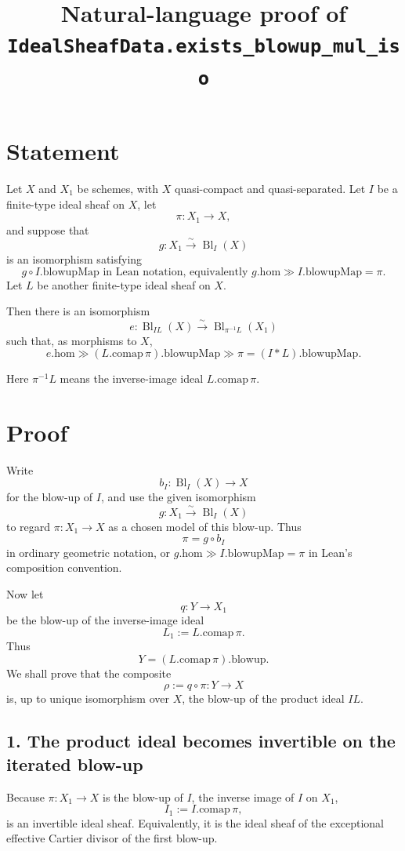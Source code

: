 \documentclass[11pt]{article}
\title{Natural-language proof of \texttt{IdealSheafData.exists\_blowup\_mul\_iso}}
\author{}
\date{}
\newcommand{\Bl}{\operatorname{Bl}}
\begin{document}
\maketitle

\section*{Statement}

Let \(X\) and \(X_1\) be schemes, with \(X\) quasi-compact and quasi-separated.
Let \(I\) be a finite-type ideal sheaf on \(X\), let
\[
  \pi : X_1 \longrightarrow X,
\]
and suppose that
\[
  g : X_1 \xrightarrow{\sim} \Bl_I(X)
\]
is an isomorphism satisfying
\[
  g \circ I.\mathrm{blowupMap} \text{ in Lean notation, equivalently }
  g.\mathrm{hom} \gg I.\mathrm{blowupMap}=\pi.
\]
Let \(L\) be another finite-type ideal sheaf on \(X\).

Then there is an isomorphism
\[
  e :
  \Bl_{I L}(X)
  \xrightarrow{\sim}
  \Bl_{\pi^{-1}L}(X_1)
\]
such that, as morphisms to \(X\),
\[
  e.\mathrm{hom}
  \gg
  (L.\mathrm{comap}\,\pi).\mathrm{blowupMap}
  \gg
  \pi
  =
  (I*L).\mathrm{blowupMap}.
\]

Here \(\pi^{-1}L\) means the inverse-image ideal
\(L.\mathrm{comap}\,\pi\).

\section*{Proof}

Write
\[
  b_I : \Bl_I(X)\longrightarrow X
\]
for the blow-up of \(I\), and use the given isomorphism
\[
  g:X_1\xrightarrow{\sim}\Bl_I(X)
\]
to regard \(\pi:X_1\to X\) as a chosen model of this blow-up.  Thus
\[
  \pi=g\circ b_I
\]
in ordinary geometric notation, or
\(g.\mathrm{hom}\gg I.\mathrm{blowupMap}=\pi\) in Lean's composition convention.

Now let
\[
  q:Y\longrightarrow X_1
\]
be the blow-up of the inverse-image ideal
\[
  L_1:=L.\mathrm{comap}\,\pi.
\]
Thus
\[
  Y=(L.\mathrm{comap}\,\pi).\mathrm{blowup}.
\]
We shall prove that the composite
\[
  \rho:=q\circ\pi:Y\longrightarrow X
\]
is, up to unique isomorphism over \(X\), the blow-up of the product ideal
\(I L\).

\subsection*{1. The product ideal becomes invertible on the iterated blow-up}

Because \(\pi:X_1\to X\) is the blow-up of \(I\), the inverse image of \(I\)
on \(X_1\),
\[
  I_1:=I.\mathrm{comap}\,\pi,
\]
is an invertible ideal sheaf.  Equivalently, it is the ideal sheaf of the
exceptional effective Cartier divisor of the first blow-up.
\end{document}
